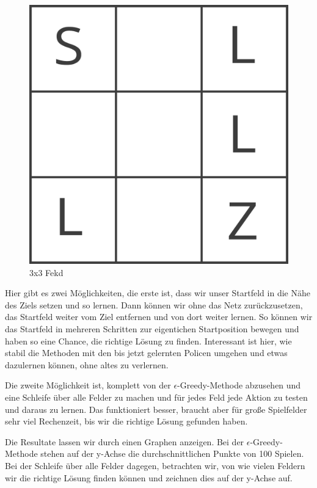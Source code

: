 \begin{figure}[H]
\centering
\includegraphics[width=\textwidth]{Figures/Intermediate.png}
\caption{3x3 Fekd}
\label{advanced}
\end{figure}

Hier gibt es zwei Möglichkeiten, die erste ist, dass wir unser Startfeld in die Nähe des Ziels setzen und so lernen. Dann können wir ohne das Netz zurückzusetzen, das Startfeld weiter vom Ziel entfernen und von dort weiter lernen. So können wir das Startfeld in mehreren Schritten zur eigentichen Startposition bewegen und haben so eine Chance, die richtige Lösung zu finden. Interessant ist hier, wie stabil die Methoden mit den bis jetzt gelernten Policen umgehen und etwas dazulernen können, ohne altes zu verlernen. 

Die zweite Möglichkeit ist, komplett von der $\epsilon$-Greedy-Methode abzusehen und eine Schleife über alle Felder zu machen und für jedes Feld jede Aktion zu testen und daraus zu lernen. Das funktioniert besser, braucht aber für große Spielfelder sehr viel Rechenzeit, bis wir die richtige Lösung gefunden haben.

Die Resultate lassen wir durch einen Graphen anzeigen. Bei der $\epsilon$-Greedy-Methode stehen auf der y-Achse die durchschnittlichen Punkte von 100 Spielen. Bei der Schleife über alle Felder dagegen, betrachten wir, von wie vielen Feldern wir die richtige Lösung finden können und zeichnen dies auf der y-Achse auf.

